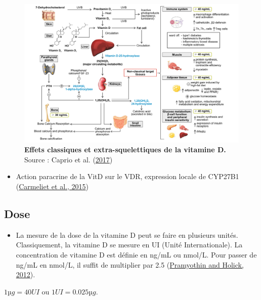 \documentclass[
  letterpaper,
  DIV=11,
  numbers=noendperiod]{scrartcl}
\providecommand{\tightlist}{%
  \setlength{\itemsep}{0pt}\setlength{\parskip}{0pt}}\usepackage{longtable,booktabs,array}
\begin{document}
\begin{figure}

{\centering \includegraphics{figures/extra-skeletal-effect.png}

}

\caption{\label{fig-extra-skeletal}\textbf{Effets classiques et
extra-squelettiques de la vitamine D.} Source : Caprio et al.
(\protect\hyperlink{ref-Caprio.2017}{2017})}

\end{figure}

\begin{itemize}
\tightlist
\item
  Action paracrine de la VitD sur le VDR, expression locale de CYP27B1
  (\protect\hyperlink{ref-Carmeliet.2015}{Carmeliet et al., 2015})
\end{itemize}

\hypertarget{dose}{%
\subsection{Dose}\label{dose}}

\begin{itemize}
\tightlist
\item
  La mesure de la dose de la vitamine D peut se faire en plusieurs
  unités. Classiquement, la vitamine D se mesure en UI (Unité
  Internationale). La concentration de vitamine D est définie en ng/mL
  ou nmol/L. Pour passer de ng/mL en nmol/L, il suffit de multiplier par
  2.5 (\protect\hyperlink{ref-Pramyothin.2012}{Pramyothin and Holick,
  2012}).
\end{itemize}

\(1 µg = 40 UI\) ou \(1 UI = 0.025 µg\).
\end{document}
